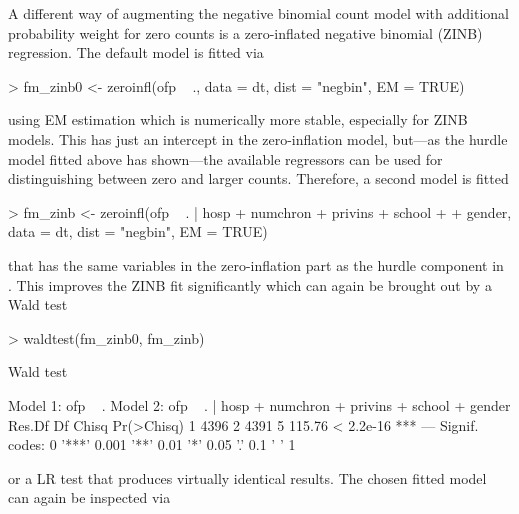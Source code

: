 \documentclass{Z}
\begin{document}
A different way of augmenting the negative binomial count model 
with additional probability weight for zero counts is a zero-inflated
negative binomial (ZINB) regression. The default model is fitted via
\begin{Schunk}
\begin{Sinput}
> fm_zinb0 <- zeroinfl(ofp ~ ., data = dt, dist = "negbin", EM = TRUE)
\end{Sinput}
\end{Schunk}
using EM estimation which is numerically more stable, especially for ZINB models.
This has just an intercept in the zero-inflation model, but---as the hurdle
model  fitted above has shown---the available regressors can be
used for distinguishing between zero and larger counts. Therefore, a second
model is fitted
\begin{Schunk}
\begin{Sinput}
> fm_zinb <- zeroinfl(ofp ~ . | hosp + numchron + privins + school + 
+     gender, data = dt, dist = "negbin", EM = TRUE)
\end{Sinput}
\end{Schunk}
that has the same variables in the zero-inflation part as the hurdle
component in . This improves the ZINB fit significantly
which can again be brought out by a Wald test
\begin{Schunk}
\begin{Sinput}
> waldtest(fm_zinb0, fm_zinb)
\end{Sinput}
\begin{Soutput}
Wald test

Model 1: ofp ~ .
Model 2: ofp ~ . | hosp + numchron + privins + school + gender
  Res.Df   Df  Chisq Pr(>Chisq)    
1   4396                           
2   4391    5 115.76  < 2.2e-16 ***
---
Signif. codes:  0 '***' 0.001 '**' 0.01 '*' 0.05 '.' 0.1 ' ' 1 
\end{Soutput}
\end{Schunk}
or a LR test  that produces virtually identical
results. The chosen fitted model can again be inspected via
\end{document}

